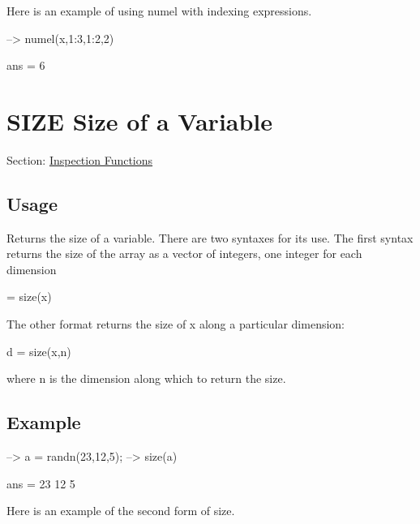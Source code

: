 Here is an example of using {\ttfamily numel} with indexing expressions.


\begin{DoxyVerbInclude}
--> numel(x,1:3,1:2,2)

ans = 
 6 
\end{DoxyVerbInclude}
 \hypertarget{inspection_size}{}\section{S\-I\-Z\-E Size of a Variable}\label{inspection_size}
Section\-: \hyperlink{sec_inspection}{Inspection Functions} \hypertarget{vtkwidgets_vtkxyplotwidget_Usage}{}\subsection{Usage}\label{vtkwidgets_vtkxyplotwidget_Usage}
Returns the size of a variable. There are two syntaxes for its use. The first syntax returns the size of the array as a vector of integers, one integer for each dimension \begin{DoxyVerb}  [d1,d2,...,dn] = size(x)
\end{DoxyVerb}
 The other format returns the size of {\ttfamily x} along a particular dimension\-: \begin{DoxyVerb}  d = size(x,n)
\end{DoxyVerb}
 where {\ttfamily n} is the dimension along which to return the size. \hypertarget{variables_struct_Example}{}\subsection{Example}\label{variables_struct_Example}

\begin{DoxyVerbInclude}
--> a = randn(23,12,5);
--> size(a)

ans = 
 23 12  5 
\end{DoxyVerbInclude}


Here is an example of the second form of {\ttfamily size}.


